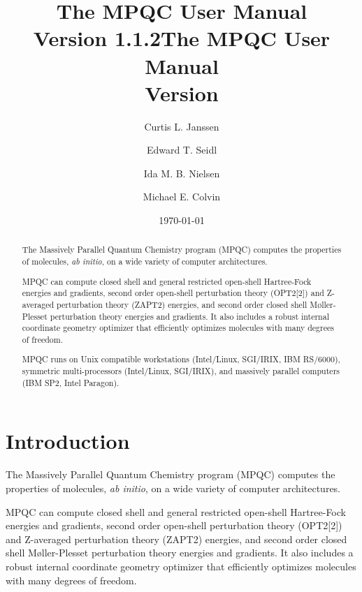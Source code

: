 \documentclass[letterpaper%
              ]{report}
\begin{document}
\begin{htmlonly}
\title{The MPQC User Manual \\
       Version 1.1.2}
\end{htmlonly}
\begin{latexonly}
\title{The MPQC User Manual \\
       Version }
\end{latexonly}

\author{Curtis L. Janssen \and Edward T. Seidl \and Ida M. B. Nielsen
        \and Michael E. Colvin}

\date{\today}

\maketitle

\begin{abstract}
The Massively Parallel Quantum Chemistry program (MPQC) computes
the properties of molecules, {\it ab initio}, on a wide variety
of computer architectures.

\begin{sloppypar}
MPQC can compute closed shell and general restricted open-shell
Hartree-Fock energies and gradients, second order open-shell
perturbation theory (OPT2[2]) and Z-averaged perturbation theory
(ZAPT2) energies, and second order closed shell M\o{}ller-Plesset
perturbation theory energies and gradients.  It also includes a
robust internal coordinate geometry optimizer that efficiently
optimizes molecules with many degrees of freedom.
\end{sloppypar}

MPQC runs on Unix compatible workstations (Intel/Linux, SGI/IRIX,
IBM RS/6000), symmetric multi-processors (Intel/Linux, SGI/IRIX), and
massively parallel computers (IBM SP2, Intel Paragon).
\end{abstract}

\tableofcontents
\listoftables

\chapter{Introduction}
The Massively Parallel Quantum Chemistry program (MPQC) computes
the properties of molecules, {\it ab initio}, on a wide variety
of computer architectures.

MPQC can compute closed shell and general restricted open-shell
Hartree-Fock energies and gradients, second order open-shell
perturbation theory (OPT2[2]) and Z-averaged perturbation theory
(ZAPT2) energies, and second order closed shell M\o{}ller-Plesset
perturbation theory energies and gradients.  It also includes a
robust internal coordinate geometry optimizer that efficiently
optimizes molecules with many degrees of freedom.
\end{document}
